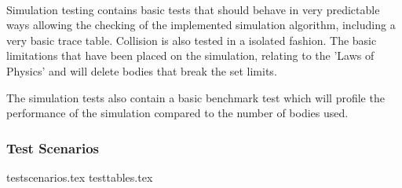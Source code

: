 \paragraph{}
Simulation testing contains basic tests that should behave in very predictable ways allowing the checking of the implemented simulation algorithm, including a very basic trace table. Collision is also tested in a isolated fashion. The basic limitations that have been placed on the simulation, relating to the 'Laws of Physics' and will delete bodies that break the set limits.

The simulation tests also contain a basic benchmark test which will profile the performance of the simulation compared to the number of bodies used.
\pagebreak
\subsubsection{Test Scenarios}
{testscenarios.tex}
{testtables.tex}
